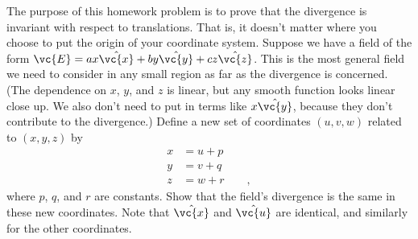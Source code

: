         The purpose of this homework problem is to prove that the
        divergence is invariant with respect to translations. That is, it
        doesn't matter where you choose to put the origin of your
        coordinate system. Suppose we have a field of the form
        $\vc{E}=ax\hat{\vc{x}}+by\hat{\vc{y}}+cz\hat{\vc{z}}$.
        This is the most general field we need to consider in
        any small region as far as the divergence is concerned. (The dependence
        on $x$, $y$, and $z$ is linear, but any smooth function looks
        linear close up. We also don't need to put in terms like
        $x\hat{\vc{y}}$, because they don't contribute to the divergence.)
        Define a new set of coordinates $(u,v,w)$ related to $(x,y,z)$  by
        \begin{align*}
                        x  &=  u + p  \\
                        y  &=  v + q     \\
                        z  &=  w + r   \qquad   ,  
        \end{align*}
        where $p$, $q$, and $r$ are constants. Show that the field's
        divergence is the same in these new coordinates. Note that $\hat{\vc{x}}$
        and $\hat{\vc{u}}$ are identical, and similarly for the other coordinates.
